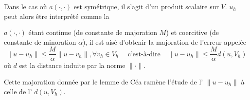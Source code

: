 Dans le cas où $a(\cdot,\cdot)$ est symétrique, il s'agit d'un produit scalaire sur $V$.
$u_h$ peut alors être interprété comme la 


\medskip
\begin{lemme}
$a(\cdot,\cdot)$ étant continue (de constante de majoration $M$) et coercitive
(de constante de minoration $\alpha$), il est aisé d'obtenir la majoration
de l'erreur appelée 
\begin{equation}
\|u-u_h\|\le\dfrac{M}{\alpha}\|u-v_h\|, \forall v_h\in V_h
\quad \text{ c'est-à-dire} \quad
\|u-u_h\|\le\dfrac{M}{\alpha}d(u,V_h)
\end{equation}
où $d$ est la distance induite par la norme $\|\cdot\|$.
\end{lemme}

Cette majoration donnée par le lemme de Céa ramène l'étude de l' $\|u-u_h\|$ à celle de l' $d(u,V_h)$.



\medskip
